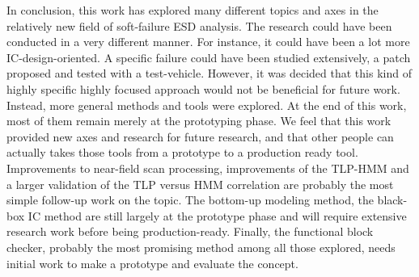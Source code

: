 In conclusion, this work has explored many different topics and axes in the relatively new field of soft-failure ESD analysis.
The research could have been conducted in a very different manner.
For instance, it could have been a lot more IC-design-oriented.
A specific failure could have been studied extensively, a patch proposed and tested with a test-vehicle.
However, it was decided that this kind of highly specific highly focused approach would not be beneficial for future work.
Instead, more general methods and tools were explored.
At the end of this work, most of them remain merely at the prototyping phase.
We feel that this work provided new axes and research for future research, and that other people can actually takes those tools from a prototype to a production ready tool.
Improvements to near-field scan processing, improvements of the TLP-HMM and a larger validation of the TLP versus HMM correlation are probably the most simple follow-up work on the topic.
The bottom-up modeling method, the black-box IC method are still largely at the prototype phase and will require extensive research work before being production-ready.
Finally, the functional block checker, probably the most promising method among all those explored, needs initial work to make a prototype and evaluate the concept.
